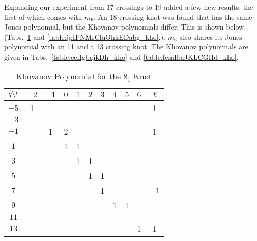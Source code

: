     Expanding our experiment from 17 crossings to 19 added a few new
    results, the first of which comes with
    $m_{6}$. An 18 crossing knot was found
    that has the same Jones polynomial, but the Khovanov polynomials
    differ. This is shown below
    (Tabs.~\ref{table:m_6_kho} and \ref{table:jpIFNMrClqOhkEDabg_kho}.).
    $m_{6}$ also shares its Jones polynomial with an 11 and a 13 crossing
    knot. The Khovanov polynomials are given in
    Tabs.~\ref{table:cefIgbajkDh_kho} and
    \ref{table:femIbaJKLCGHd_kho}.
    \begin{table}
        \centering
        \begin{tabular}{| c | c | c | c | c | c | c | c | c | c | c |}
            \hline
            $q\symbol{92}t$&$-2$&$-1$&$0$&$1$&$2$&$3$&$4$&$5$&$6$&$\chi$\\
            \hline
            $-5$&1&&&&&&&&&1\\
            \hline
            $-3$&&&&&&&&&&\\
            \hline
            $-1$&&1&2&&&&&&&1\\
            \hline
            $1$&&&1&1&&&&&&\\
            \hline
            $3$&&&&1&1&&&&&\\
            \hline
            $5$&&&&&1&1&&&&\\
            \hline
            $7$&&&&&&1&&&&$-1$\\
            \hline
            $9$&&&&&&&1&1&&\\
            \hline
            $11$&&&&&&&&&&\\
            \hline
            $13$&&&&&&&&&1&1\\
            \hline
        \end{tabular}
        \caption{Khovanov Polynomial for the $8_{1}$ Knot}
        \label{table:m_6_kho}
    \end{table}
